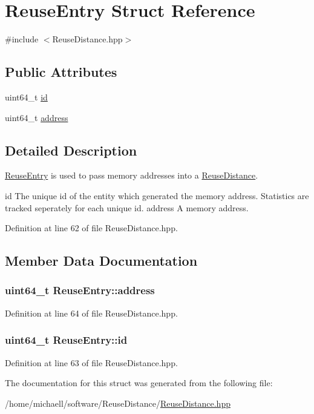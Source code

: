 \hypertarget{struct_reuse_entry}{
\section{ReuseEntry Struct Reference}
\label{struct_reuse_entry}
}


{\ttfamily \#include $<$ReuseDistance.hpp$>$}

\subsection*{Public Attributes}
\begin{DoxyCompactItemize}
\item 
uint64\_\-t \hyperlink{struct_reuse_entry_ab30e9a6fae29a6453f5fa2245e441f3a}{id}
\item 
uint64\_\-t \hyperlink{struct_reuse_entry_a40bd37796c5f75438f28f5b6d090a432}{address}
\end{DoxyCompactItemize}


\subsection{Detailed Description}
\hyperlink{struct_reuse_entry}{ReuseEntry} is used to pass memory addresses into a \hyperlink{class_reuse_distance}{ReuseDistance}.

id The unique id of the entity which generated the memory address. Statistics are tracked seperately for each unique id.  address A memory address. 

Definition at line 62 of file ReuseDistance.hpp.



\subsection{Member Data Documentation}
\hypertarget{struct_reuse_entry_a40bd37796c5f75438f28f5b6d090a432}{
\subsubsection[{address}]{\setlength{\rightskip}{0pt plus 5cm}uint64\_\-t {\bf ReuseEntry::address}}}
\label{struct_reuse_entry_a40bd37796c5f75438f28f5b6d090a432}


Definition at line 64 of file ReuseDistance.hpp.

\hypertarget{struct_reuse_entry_ab30e9a6fae29a6453f5fa2245e441f3a}{
\subsubsection[{id}]{\setlength{\rightskip}{0pt plus 5cm}uint64\_\-t {\bf ReuseEntry::id}}}
\label{struct_reuse_entry_ab30e9a6fae29a6453f5fa2245e441f3a}


Definition at line 63 of file ReuseDistance.hpp.



The documentation for this struct was generated from the following file:\begin{DoxyCompactItemize}
\item 
/home/michaell/software/ReuseDistance/\hyperlink{_reuse_distance_8hpp}{ReuseDistance.hpp}\end{DoxyCompactItemize}
